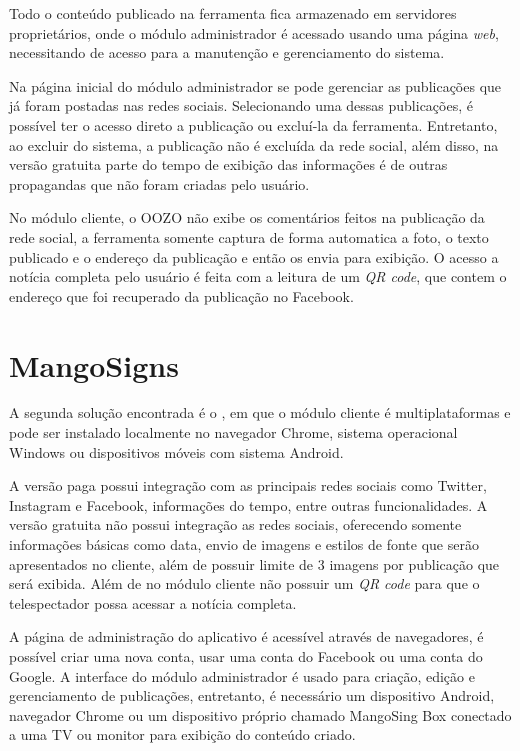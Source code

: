 Todo o conteúdo publicado na ferramenta fica armazenado em servidores proprietários, onde o módulo administrador é acessado usando uma página \textit{web}, necessitando de acesso para a manutenção e gerenciamento do sistema. 

Na página inicial do módulo administrador se pode gerenciar as publicações que já foram postadas nas redes sociais. Selecionando uma dessas publicações, é possível ter o acesso direto a publicação ou excluí-la da ferramenta. Entretanto, ao excluir do sistema, a publicação não é excluída da rede social, além disso, na versão gratuita parte do tempo de exibição das informações é de outras propagandas que não foram criadas pelo usuário. 

No módulo cliente, o OOZO não exibe os comentários feitos na publicação da rede social, a ferramenta somente captura de forma automatica a foto, o texto publicado e o endereço da publicação e então os envia para exibição. O acesso a notícia completa pelo usuário é feita com a leitura de um \textit{QR code}, que contem o endereço que foi recuperado da publicação no Facebook.

\section{MangoSigns}
\label{sec:mango}
A segunda solução encontrada é o \citet{mango2017}, em que o módulo cliente é multiplataformas e pode ser instalado localmente no navegador Chrome, sistema operacional Windows ou dispositivos móveis com sistema Android.

A versão paga possui integração com as principais redes sociais como Twitter, Instagram e Facebook, informações do tempo, entre outras funcionalidades. A versão gratuita não possui integração as redes sociais, oferecendo somente informações básicas como data, envio de imagens e estilos de fonte que serão apresentados no cliente, além de possuir limite de 3 imagens por publicação que será exibida. Além de no módulo cliente não possuir um \textit{QR code} para que o telespectador possa acessar a notícia completa.

A página de administração do aplicativo é acessível através de navegadores, é possível criar uma nova conta, usar uma conta do Facebook ou uma conta do Google. A interface do módulo administrador é usado para criação, edição e gerenciamento de publicações, entretanto, é necessário um dispositivo Android, navegador Chrome ou um dispositivo próprio chamado MangoSing Box conectado a uma TV ou monitor para exibição do conteúdo criado.

